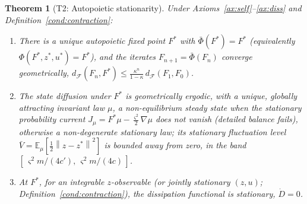 \documentclass[11pt]{article}
\theoremstyle{plain}
\newtheorem{theorem}{Theorem}[section]
\theoremstyle{definition}
\theoremstyle{remark}
\newcommand{\E}{\mathbb{E}}
\newcommand{\norm}[1]{\left\lVert#1\right\rVert}
\begin{document}
\begin{theorem}[T2: Autopoietic stationarity]\label{thm:t2}
Under Axioms~\ref{ax:self}--\ref{ax:diss} and Definition~\ref{cond:contraction}:
\begin{enumerate}[label=\textnormal{(\roman*)},leftmargin=2.2em]
\item There is a unique autopoietic fixed point $F^*$ with $\bar\Phi(F^*)=F^*$ (equivalently $\Phi(F^*,z^*,u^*)=F^*$), and the iterates $F_{n+1}=\bar\Phi(F_n)$ converge geometrically, $d_{\mathcal F}(F_n,F^*)\le\frac{\kappa^{n}}{1-\kappa}\,d_{\mathcal F}(F_1,F_0)$.
\item The state diffusion under $F^*$ is geometrically ergodic, with a unique, globally attracting invariant law $\mu$, a non-equilibrium steady state when the stationary probability current $J_\mu=F^*\mu-\tfrac{\varsigma^2}{2}\nabla\mu$ does not vanish (detailed balance fails), otherwise a non-degenerate stationary law; its stationary fluctuation level $\bar V=\E_\mu[\tfrac12\norm{z-z^*}^2]$ is bounded away from zero, in the band $[\,\varsigma^2 m/(4c'),\,\varsigma^2 m/(4c)\,]$.
\item At $F^*$, for an integrable $z$-observable (or jointly stationary $(z,u)$; Definition~\ref{cond:contraction}), the dissipation functional is stationary, $\dot D=0$.
\end{enumerate}
\end{theorem}
\end{document}
